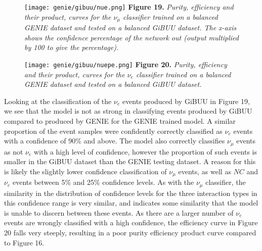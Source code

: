 \begin{figure}[t!]
 \centering
 \texttt{[image: genie/gibuu/nue.png]}
 \textbf{Figure 19.} \textit{Purity, efficiency and their product, curves for the $\nu_\mu$ classifier trained on a balanced GENIE dataset and tested on a balanced GiBUU dataset. The x-axis shows the confidence percentage of the network out (output multiplied by 100 to give the percentage).}

 \texttt{[image: genie/gibuu/nuepe.png]}
 \textbf{Figure 20.} \textit{Purity, efficiency and their product, curves for the $\nu_e$ classifier trained on a balanced GENIE dataset and tested on a balanced GiBUU dataset.}
\end{figure}

\noindent Looking at the classification of the $\nu_e$ events produced by GiBUU in Figure 19, we see that the model is not as strong in classifying events produced by GiBUU compared to produced by GENIE for the GENIE trained model. A similar proportion of the event samples were confidently correctly classified as $\nu_e$ events with a confidence of 90\% and above. The model also correctly classifies $\nu_\mu$ events as not $\nu_e$ with a high level of confidence, however the proportion of such events is smaller in the GiBUU dataset than the GENIE testing dataset. A reason for this is likely the slightly lower confidence classification of $\nu_\mu$ events, as well as $NC$ and $\nu_e$ events between 5\% and 25\% confidence levels. As with the $\nu_\mu$ classifier, the similarity in the distribution of confidence levels for the three interaction types in this confidence range is very similar, and indicates some similarity that the model is unable to discern between these events. As there are a larger number of $\nu_e$ events are wrongly classified with a high confidence, the efficiency curve in Figure 20 falls very steeply, resulting in a poor purity efficiency product curve compared to Figure 16. \medskip